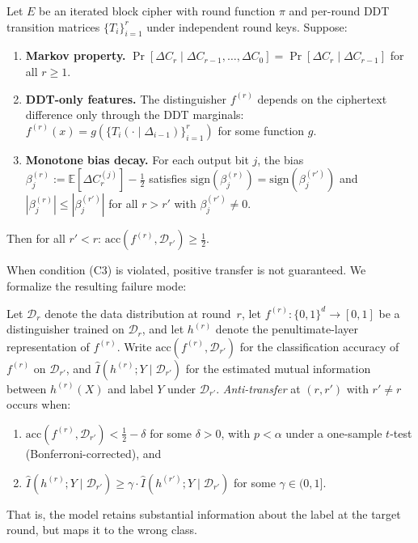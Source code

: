 \documentclass[runningheads]{llncs}
\begin{document}
\begin{theorem}
\label{thm:markov}
Let $E$ be an iterated block cipher with round function $\pi$
and per-round DDT transition matrices $\{T_i\}_{i=1}^{r}$ under
independent round keys. Suppose:
\begin{enumerate}[label=\textup{(C\arabic*)},itemsep=2pt]
  \item \textbf{Markov property.}
        $\Pr[\Delta C_r \mid \Delta C_{r-1}, \ldots, \Delta C_0]
        = \Pr[\Delta C_r \mid \Delta C_{r-1}]$ for all $r \geq 1$.
  \item \textbf{DDT-only features.}
        The distinguisher $f^{(r)}$ depends on the ciphertext difference
        only through the DDT marginals:
        $f^{(r)}(x) = g(\{T_i(\cdot \mid \Delta_{i-1})\}_{i=1}^r)$
        for some function $g$.
  \item \textbf{Monotone bias decay.}
        For each output bit $j$, the bias
        $\beta_j^{(r)} := \mathbb{E}[\Delta C_r^{(j)}] - \tfrac{1}{2}$
        satisfies $\mathrm{sign}(\beta_j^{(r)})
        = \mathrm{sign}(\beta_j^{(r')})$ and
        $|\beta_j^{(r)}| \leq |\beta_j^{(r')}|$
        for all $r > r'$ with $\beta_j^{(r')} \neq 0$.
\end{enumerate}
Then for all $r' < r$:
$\mathrm{acc}(f^{(r)}, \mathcal{D}_{r'}) \geq \tfrac{1}{2}$.
\end{theorem}

When condition (C3) is violated, positive transfer is not guaranteed.
We formalize the resulting failure mode:

\begin{definition}
\label{def:anti-transfer}
Let $\mathcal{D}_r$ denote the data distribution at round~$r$,
let $f^{(r)}: \{0,1\}^d \to [0,1]$ be a distinguisher trained on $\mathcal{D}_r$,
and let $h^{(r)}$ denote the penultimate-layer representation of $f^{(r)}$.
Write $\mathrm{acc}(f^{(r)}, \mathcal{D}_{r'})$ for the classification accuracy
of $f^{(r)}$ on $\mathcal{D}_{r'}$, and
$\hat{I}(h^{(r)}; Y \mid \mathcal{D}_{r'})$ for the estimated
mutual information between $h^{(r)}(X)$ and label $Y$ under $\mathcal{D}_{r'}$.
\emph{Anti-transfer} at $(r, r')$ with $r' \neq r$ occurs when:
\begin{enumerate}[label=(\roman*),itemsep=0pt]
  \item $\mathrm{acc}(f^{(r)}, \mathcal{D}_{r'}) < \tfrac{1}{2} - \delta$
        for some $\delta > 0$, with $p < \alpha$ under a one-sample
        $t$-test (Bonferroni-corrected), and
  \item $\hat{I}(h^{(r)}; Y \mid \mathcal{D}_{r'}) \geq
        \gamma \cdot \hat{I}(h^{(r')}; Y \mid \mathcal{D}_{r'})$
        for some $\gamma \in (0,1]$.
\end{enumerate}
That is, the model retains substantial information about the label at the target round, but maps it to the wrong class.
\end{definition}
\end{document}
